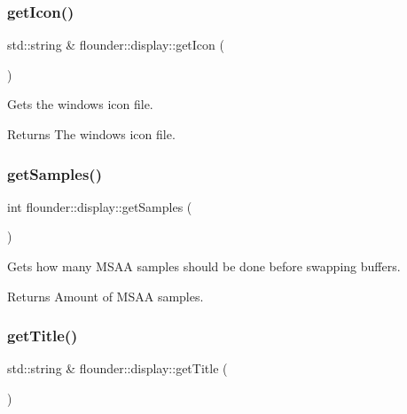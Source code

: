 \subsubsection{\texorpdfstring{get\+Icon()}{getIcon()}}
{\footnotesize\ttfamily std\+::string \& flounder\+::display\+::get\+Icon (\begin{DoxyParamCaption}{ }\end{DoxyParamCaption})}



Gets the window\textquotesingle{}s icon file. 

\begin{DoxyReturn}{Returns}
The window\textquotesingle{}s icon file. 
\end{DoxyReturn}
\mbox{\label{classflounder_1_1display_a3f1438e0d64121ae94e3e1f1931dc09a}} 
\subsubsection{\texorpdfstring{get\+Samples()}{getSamples()}}
{\footnotesize\ttfamily int flounder\+::display\+::get\+Samples (\begin{DoxyParamCaption}{ }\end{DoxyParamCaption})}



Gets how many M\+S\+AA samples should be done before swapping buffers. 

\begin{DoxyReturn}{Returns}
Amount of M\+S\+AA samples. 
\end{DoxyReturn}
\mbox{\label{classflounder_1_1display_ad5fc46c79d236783ac883878ec065f36}} 
\subsubsection{\texorpdfstring{get\+Title()}{getTitle()}}
{\footnotesize\ttfamily std\+::string \& flounder\+::display\+::get\+Title (\begin{DoxyParamCaption}{ }\end{DoxyParamCaption})}




